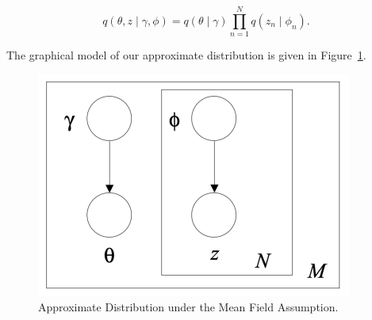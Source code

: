 \documentclass[a4paper]{article}
\begin{document}
	\begin{equation}
		q(\theta,z \mid \gamma,\phi) = q(\theta\mid\gamma) \prod_{n=1}^{N} q(z_n\mid\phi_n).
	\end{equation}
	
	\noindent The graphical model of our approximate distribution is given in Figure~\ref{fig:approximategraphical}.
	
	\begin{figure}[ht]
		\centering
		\captionsetup{width=.8\linewidth}
		\includegraphics[width=0.5\linewidth]{images/approximate_graphical}
		\caption{Approximate Distribution under the Mean Field Assumption.}
		\label{fig:approximategraphical}
	\end{figure}
	
	
	\clearpage
	
\end{document}
